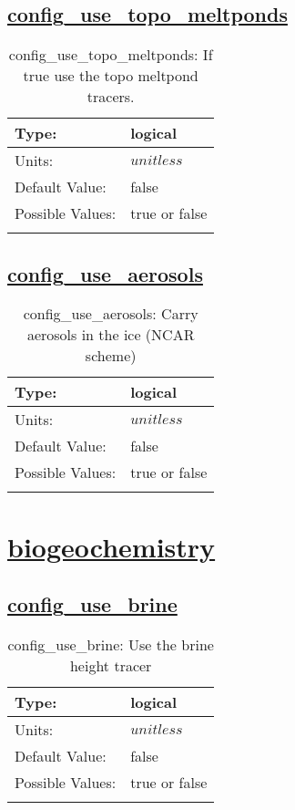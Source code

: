 \subsection[config\_use\_topo\_meltponds]{\hyperref[sec:nm_tab_column_tracers]{config\_use\_topo\_meltponds}}
\label{subsec:nm_sec_config_use_topo_meltponds}
\begin{center}
\begin{longtable}{| p{2.0in} || p{4.0in} |}
    \hline
    Type: & logical \\
    \hline
    Units: & $unitless$ \\
    \hline
    Default Value: & false \\
    \hline
    Possible Values: & true or false \\
    \hline
    \caption{config\_use\_topo\_meltponds: If true use the topo meltpond tracers.}
\end{longtable}
\end{center}
\subsection[config\_use\_aerosols]{\hyperref[sec:nm_tab_column_tracers]{config\_use\_aerosols}}
\label{subsec:nm_sec_config_use_aerosols}
\begin{center}
\begin{longtable}{| p{2.0in} || p{4.0in} |}
    \hline
    Type: & logical \\
    \hline
    Units: & $unitless$ \\
    \hline
    Default Value: & false \\
    \hline
    Possible Values: & true or false \\
    \hline
    \caption{config\_use\_aerosols: Carry aerosols in the ice (NCAR scheme)}
\end{longtable}
\end{center}
\section[biogeochemistry]{\hyperref[sec:nm_tab_biogeochemistry]{biogeochemistry}}
\label{sec:nm_sec_biogeochemistry}
\subsection[config\_use\_brine]{\hyperref[sec:nm_tab_biogeochemistry]{config\_use\_brine}}
\label{subsec:nm_sec_config_use_brine}
\begin{center}
\begin{longtable}{| p{2.0in} || p{4.0in} |}
    \hline
    Type: & logical \\
    \hline
    Units: & $unitless$ \\
    \hline
    Default Value: & false \\
    \hline
    Possible Values: & true or false \\
    \hline
    \caption{config\_use\_brine: Use the brine height tracer}
\end{longtable}
\end{center}
